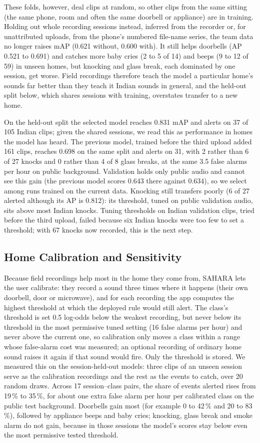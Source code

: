 \documentclass{svproc}
\begin{document}
These folds, however, deal clips at random, so other clips from the same sitting (the same phone, room and often the same doorbell or appliance) are in training. Holding out whole recording sessions instead, inferred from the recorder or, for unattributed uploads, from the phone's numbered file-name series, the team data no longer raises mAP (0.621 without, 0.600 with). It still helps doorbells (AP 0.521 to 0.691) and catches more baby cries (2 to 5 of 14) and beeps (9 to 12 of 59) in unseen homes, but knocking and glass break, each dominated by one session, get worse. Field recordings therefore teach the model a particular home's sounds far better than they teach it Indian sounds in general, and the held-out split below, which shares sessions with training, overstates transfer to a new home.

On the held-out split the selected model reaches 0.831 mAP and alerts on 37 of 105 Indian clips; given the shared sessions, we read this as performance in homes the model has heard. The previous model, trained before the third upload added 161 clips, reaches 0.698 on the same split and alerts on 31, with 2 rather than 6 of 27 knocks and 0 rather than 4 of 8 glass breaks, at the same 3.5 false alarms per hour on public background. Validation holds only public audio and cannot see this gain (the previous model scores 0.643 there against 0.634), so we select among runs trained on the current data. Knocking still transfers poorly (6 of 27 alerted although its AP is 0.812): its threshold, tuned on public validation audio, sits above most Indian knocks. Tuning thresholds on Indian validation clips, tried before the third upload, failed because six Indian knocks were too few to set a threshold; with 67 knocks now recorded, this is the next step.

\subsection{Home Calibration and Sensitivity}
Because field recordings help most in the home they come from, SAHARA lets the user calibrate: they record a sound three times where it happens (their own doorbell, door or microwave), and for each recording the app computes the highest threshold at which the deployed rule would still alert. The class's threshold is set 0.5 log-odds below the weakest recording, but never below its threshold in the most permissive tuned setting (16 false alarms per hour) and never above the current one, so calibration only moves a class within a range whose false-alarm cost was measured; an optional recording of ordinary home sound raises it again if that sound would fire. Only the threshold is stored. We measured this on the session-held-out models: three clips of an unseen session serve as the calibration recordings and the rest as the events to catch, over 20 random draws. Across 17 session--class pairs, the share of events alerted rises from 19\,\% to 35\,\%, for about one extra false alarm per hour per calibrated class on the public test background. Doorbells gain most (for example 0 to 42\,\% and 20 to 83\,\%), followed by appliance beeps and baby cries; knocking, glass break and smoke alarm do not gain, because in those sessions the model's scores stay below even the most permissive tested threshold.
\end{document}

